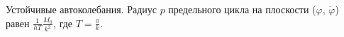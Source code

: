Устойчивые автоколебания.
Радиус $p$ предельного цикла на плоскости ($\varphi$, $\dot{\varphi}$)
равен $\frac{1}{hT}\frac{M_0}{k^2}$, где $T = \frac{\pi}{k}$.
